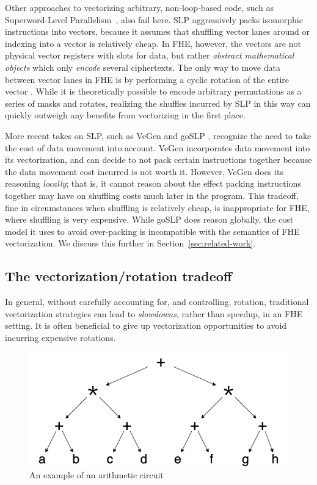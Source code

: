 Other approaches to vectorizing arbitrary, non-loop-based code, such as Superword-Level Parallelism~\cite{SLP}, also fail here.
SLP aggressively packs isomorphic instructions into vectors, because it assumes that shuffling vector lanes around or indexing into a vector is relatively cheap.
In FHE, however, the vectors are not physical vector registers with slots for data, but rather {\em abstract mathematical objects} which only {\em encode} several ciphertexts.
The only way to move data between vector lanes in FHE is by performing a cyclic rotation of the entire vector .
While it is theoretically possible to encode arbitrary permutations as a series of masks and rotates, realizing the shuffles incurred by SLP in this way can quickly outweigh any benefits from vectorizing in the first place. 

More recent takes on SLP, such as VeGen \cite{VeGen} and goSLP \cite{goSLP}, recognize the need to take the cost of data movement into account.
VeGen incorporates data movement into its vectorization, and can decide to not pack certain instructions together because the data movement cost incurred is not worth it.
However, VeGen does its reasoning {\em locally}; that is, it cannot reason about the effect packing instructions together may have on shuffling costs much later in the program. This tradeoff, fine in circumstances when shuffling is relatively cheap, is inappropriate for FHE, where shuffling is very expensive.
While goSLP does reason globally, the cost model it uses to avoid over-packing is incompatible with the semantics of FHE vectorization.
We discuss this further in Section~\ref{sec:related-work}.

\subsection*{The vectorization/rotation tradeoff}

In general, without carefully accounting for, and controlling, rotation, traditional vectorization strategies can lead to {\em slowdowns}, rather than speedup, in an FHE setting. It is often beneficial to give up vectorization opportunities to avoid incurring expensive rotations.

\begin{figure}
    \includegraphics[width=0.6\linewidth]{figures/compilation_overview/coyote_running_example.drawio.png}
    \vspace{-1em}
    \caption{An example of an arithmetic circuit}\label{fig:example-circuit}
\end{figure}



